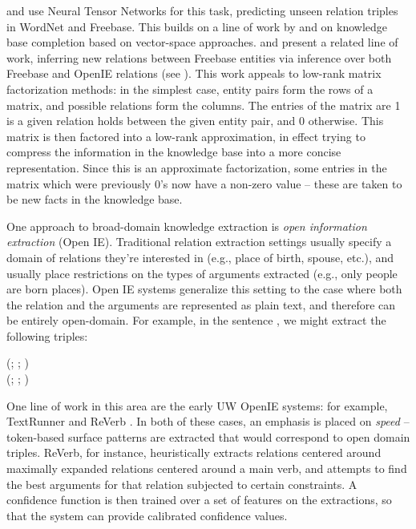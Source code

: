  and 
  use Neural Tensor Networks for this task, predicting unseen relation triples in
  WordNet and Freebase.
This builds on a line of work by
   and
   on knowledge base completion based on vector-space
  approaches.
 and 
  present a related line of work, inferring new relations between
  Freebase entities via inference over both Freebase and
  OpenIE relations (see ).
This work appeals to low-rank matrix factorization methods:
  in the simplest case, entity pairs form the rows of a matrix, and possible relations
  form the columns.
The entries of the matrix are 1 is a given relation holds between the given entity pair,
  and 0 otherwise.
This matrix is then factored into a low-rank approximation, in effect trying to compress
  the information in the knowledge base into a more concise representation.
Since this is an approximate factorization, some entries in the matrix which were previously
  0's now have a non-zero value -- these are taken to be new facts in the knowledge base.



%
%
One approach to broad-domain knowledge extraction is \textit{open information extraction} (Open IE).
Traditional relation extraction settings usually specify a domain of relations they're
  interested in (e.g., place of birth, spouse, etc.), and usually place restrictions on the
  types of arguments extracted (e.g., only people are born places).
Open IE systems generalize this setting to the case where both the relation and the arguments
  are represented as plain text, and therefore can be entirely open-domain.
For example, in the sentence , we might extract
  the following triples:

\begin{displayquote}
  (; ; ) \\
  (; ; )
\end{displayquote}


One line of work in this area are the early UW OpenIE systems: for example,
  TextRunner \cite{key:2007yates-textrunner} and
  ReVerb \cite{key:2011fader-reverb}.
In both of these cases, an emphasis is placed on \textit{speed} --
  token-based surface patterns are extracted that would correspond to
  open domain triples.
ReVerb, for instance, heuristically extracts relations centered around maximally expanded
  relations centered around a main verb, and attempts to find the best arguments
  for that relation subjected to certain constraints.
A confidence function is then trained over a set of features on the extractions, so that
  the system can provide calibrated confidence values.

